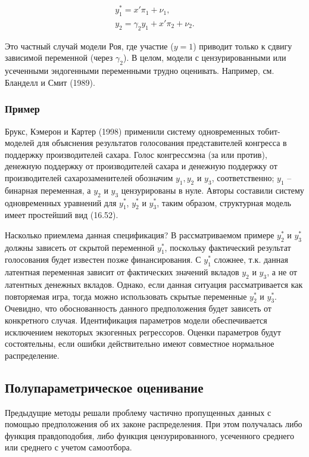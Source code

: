 \[
\begin{array}{l}
y_1^{*}=x'\pi_1+\nu_1,\\
y_2=\gamma_2{y_1}+x'\pi_2+\nu_2.
\end{array}
\]

Это частный случай модели Роя, где участие ($y=1$) приводит только к сдвигу зависимой переменной (через $\gamma_2$). В целом, модели с цензурированными или усеченными эндогенными переменными трудно оценивать. Например, см. Бланделл и Смит (1989).

\subsubsection*{Пример}

Брукс, Кэмерон и Картер (1998) применили систему одновременных тобит-моделей для объяснения результатов голосования представителей конгресса в поддержку производителей сахара. Голос конгрессмэна (за или против), денежную поддержку от производителей сахара и денежную поддержку от производителей сахарозаменителей обозначим  $y_1, y_2$ и $y_3$, соответственно; $y_1$ -- бинарная переменная, а $y_2$ и $y_3$ цензурированы в нуле. Авторы составили систему одновременных уравнений для $y_1^{*}$, $y_2^{*}$ и $y_3^{*}$, таким образом, структурная модель имеет простейший вид (16.52).

Насколько приемлема данная спецификация? В рассматриваемом примере $y_2^{*}$ и $y_3^{*}$ должны зависеть от скрытой переменной $y_1^{*}$, поскольку фактический результат голосования  будет известен позже финансирования. С $y_1^{*}$ сложнее, т.к. данная латентная переменная зависит от фактических значений вкладов $y_2$ и $y_3$, а не от латентных денежных вкладов. Однако, если данная ситуация рассматривается как повторяемая игра, тогда можно использовать скрытые переменные $y_2^{*}$ и $y_3^{*}$. Очевидно, что обоснованность данного предположения будет зависеть от конкретного случая. Идентификация параметров модели обеспечивается исключением некоторых экзогенных регрессоров. Оценки параметров будут состоятельны, если ошибки действительно имеют совместное нормальное распределение.

\subsection{Полупараметрическое оценивание}

Предыдущие методы решали проблему частично пропущенных данных с помощью предположения об их законе распределения. При этом получалась либо функция правдоподобия, либо функция цензурированного, усеченного среднего или среднего с учетом самоотбора.


